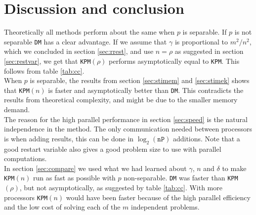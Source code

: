 \chapter{Discussion and conclusion}%

Theoretically all methods perform about the same when $p$ is separable. If $p$ is not separable \texttt{DM} has a clear advantage. If we assume that $\gamma$ is proportional to $m^2/n^2$, which we concluded in section \ref{sec:rrest}, and use $n = \rho$ as suggested in section \ref{sec:restvar}, we get that \texttt{KPM}$(\rho)$ performs asymptotically equal to \texttt{KPM}. This follows from table \ref{tab:cc}. \\

When $p$ is separable, the results from section \ref{sec:stimem} and \ref{sec:stimek} shows that \texttt{KPM}$(n)$ is faster and asymptotically better than \texttt{DM}. This contradicts the results from theoretical complexity, and might be due to the smaller memory demand. \\

The reason for the high parallel performance in section \ref{sec:speed} is the natural independence in the method. The only communication needed between processors is when adding results, this can be done in $\log_2(\texttt{nP})$ additions. Note that a good restart variable also gives a good problem size to use with parallel computations. \\

In section \ref{sec:compare} we used what we had learned about $\gamma$, $n$ and $\delta$ to make \texttt{KPM}$(n)$ run as fast as possible with $p$ non-separable. \texttt{DM} was faster than \texttt{KPM}$(\rho)$, but not asymptotically, as suggested by table \ref{tab:cc}. With more processors \texttt{KPM}$(n)$ would have been faster because of the high parallel efficiency and the low cost of solving each of the $m$ independent problems. \\





